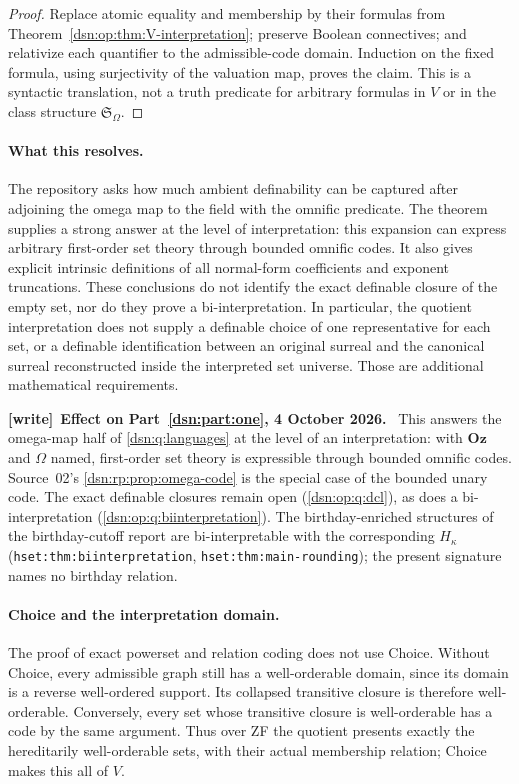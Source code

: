 \documentclass[11pt,a4paper]{article}
\numberwithin{equation}{section}
\theoremstyle{definition}
\theoremstyle{remark}
\newcommand{\Oz}{\mathbf{Oz}}
\newcommand{\lbl}[1]{\nolinkurl{#1}}
\newenvironment{writenote}[1][]{\par\medskip\begingroup\small\noindent\textbf{[write]}\if\relax\detokenize{#1}\relax\else~\textbf{#1.}\fi~\ignorespaces}{\par\endgroup\medskip}
\newcommand{\Somega}{\mathfrak S_\Omega}
\begin{document}
\begin{proof}
Replace atomic equality and membership by their formulas from
Theorem~\ref{dsn:op:thm:V-interpretation}; preserve Boolean connectives; and
relativize each quantifier to the admissible-code domain.  Induction on
the fixed formula, using surjectivity of the valuation map, proves the
claim.  This is a syntactic translation, not a truth predicate for
arbitrary formulas in $V$ or in the class structure $\Somega$.
\end{proof}

\paragraph{What this resolves.}
The repository asks how much ambient definability can be captured after
adjoining the omega map to the field with the omnific predicate.  The
theorem supplies a strong answer at the level of interpretation: this
expansion can express arbitrary first-order set theory through bounded
omnific codes.  It also gives explicit intrinsic definitions of all
normal-form coefficients and exponent truncations.  These conclusions
do not identify the exact definable closure of the empty set, nor do they
prove a bi-interpretation.  In particular, the quotient interpretation
does not supply a definable choice of one representative for each set,
or a definable identification between an original surreal and the
canonical surreal reconstructed inside the interpreted set universe.
Those are additional mathematical requirements.
\begin{writenote}[Effect on Part~\ref{dsn:part:one}, 4 October 2026]
This answers the omega-map half of \cref{dsn:q:languages} at the level of an
interpretation: with $\Oz$ and $\Omega$ named, first-order set theory is
expressible through bounded omnific codes. Source~02's
\cref{dsn:rp:prop:omega-code} is the special case of the bounded unary code.
The exact definable closures remain open (\cref{dsn:op:q:dcl}), as does a
bi-interpretation (\cref{dsn:op:q:biinterpretation}). The birthday-enriched
structures of the birthday-cutoff report are bi-interpretable with the
corresponding $H_\kappa$ (\lbl{hset:thm:biinterpretation},
\lbl{hset:thm:main-rounding}); the present signature names no birthday
relation.
\end{writenote}


\paragraph{Choice and the interpretation domain.}
The proof of exact powerset and relation coding does not use Choice.
Without Choice, every admissible graph still has a well-orderable domain,
since its domain is a reverse well-ordered support.  Its collapsed
transitive closure is therefore well-orderable.  Conversely, every set
whose transitive closure is well-orderable has a code by the same argument.
Thus over ZF the quotient presents exactly the hereditarily well-orderable
sets, with their actual membership relation; Choice makes this all of $V$.
\end{document}
